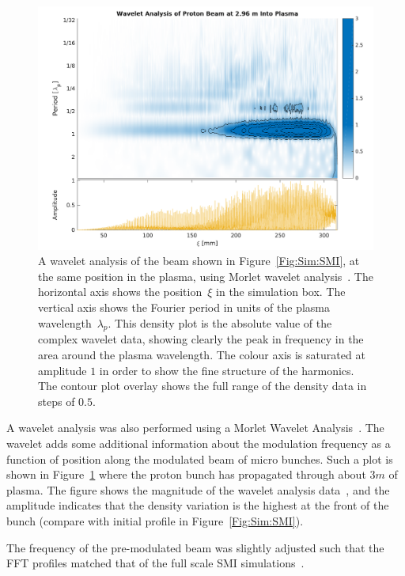 \begin{figure}[hbt]
    \centering
    \includegraphics[width=1.0\linewidth]{figures/PBSMIWavelet}
    \caption{\label{Fig:SimA:Wavelet}
        A wavelet analysis of the beam shown in Figure~\ref{Fig:Sim:SMI}, at the same position in the plasma, using Morlet wavelet analysis~\cite{torrence:1998}.
        The horizontal axis shows the position~$\xi$ in the simulation box.
        The vertical axis shows the Fourier period in units of the plasma wavelength~$\lambda_p$.
        This density plot is the absolute value of the complex wavelet data, showing clearly the peak in frequency in the area around the plasma wavelength.
        The colour axis is saturated at amplitude $1$ in order to show the fine structure of the harmonics.
        The contour plot overlay shows the full range of the density data in steps of $0.5$.
    }
\end{figure}

A wavelet analysis was also performed using a Morlet Wavelet Analysis~\cite{goupillaud:1984,bernardino:2005}.
The wavelet adds some additional information about the modulation frequency as a function of position along the modulated beam of micro bunches.
Such a plot is shown in Figure~\ref{Fig:SimA:Wavelet} where the proton bunch has propagated through about $3\unit{m}$ of plasma.
The figure shows the magnitude of the wavelet analysis data~\cite{lee:1994}, and the amplitude indicates that the density variation is the highest at the front of the bunch (compare with initial profile in Figure~\ref{Fig:Sim:SMI}).

The frequency of the pre-modulated beam was slightly adjusted such that the FFT profiles matched that of the full scale SMI simulations~\cite{berglyd_olsen:2015}.

